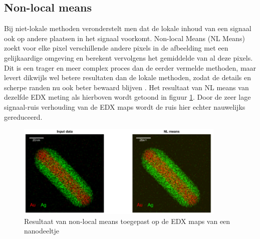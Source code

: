 \documentclass{report}
\begin{document}
\subsection{Non-local means}
Bij niet-lokale methoden veronderstelt men dat de lokale inhoud van een signaal ook op andere plaatsen in het signaal voorkomt. Non-local Means (NL Means) zoekt voor elke pixel verschillende andere pixels in de afbeelding met een gelijkaardige omgeving en berekent vervolgens het gemiddelde van al deze pixels. Dit is een trager en meer complex proces dan de eerder vermelde methoden, maar levert dikwijls wel betere resultaten dan de lokale methoden, zodat de details en scherpe randen nu ook beter bewaard blijven \cite{paper:nlm}. Het resultaat van NL means van dezelfde EDX meting als hierboven wordt getoond in figuur \ref{fig:tem_nlm}. Door de zeer lage signaal-ruis verhouding van de EDX maps wordt de ruis hier echter nauwelijks gereduceerd.
\begin{figure}[h!]
	\centering
	\includegraphics[width=10cm]{images/tem/nlm.png}
	\caption{Resultaat van non-local means toegepast op de EDX maps van een nanodeeltje}
	\label{fig:tem_nlm}
\end{figure}
\end{document}
